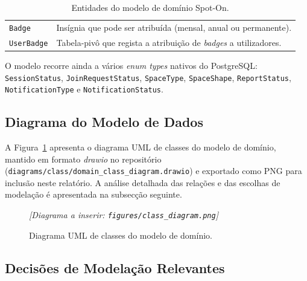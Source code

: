 \documentclass[11pt,a4paper]{article}
\begin{document}
\begin{table}[H]
\begin{tabularx}{\linewidth}{@{}lX@{}}
        \texttt{Badge}              & Insígnia que pode ser atribuída (mensal, anual ou permanente).                                                                                                            \\
        \texttt{UserBadge}          & Tabela-pivô que regista a atribuição de \emph{badges} a utilizadores.                                                                                                     \\
        \bottomrule
    \end{tabularx}
    \caption{Entidades do modelo de domínio Spot-On.}
\end{table}

O modelo recorre ainda a vários \emph{enum types} nativos do PostgreSQL:
\texttt{SessionStatus}, \texttt{JoinRequestStatus}, \texttt{SpaceType},
\texttt{SpaceShape}, \texttt{ReportStatus}, \texttt{NotificationType} e
\texttt{NotificationStatus}.

\subsection{Diagrama do Modelo de Dados}

A Figura~\ref{fig:classdiag} apresenta o diagrama UML de classes do modelo de
domínio, mantido em formato \emph{drawio} no repositório
(\texttt{diagrams/class/domain\_class\_diagram.drawio}) e exportado como PNG
para inclusão neste relatório. A análise detalhada das relações e das
escolhas de modelação é apresentada na subsecção seguinte.

\begin{figure}[H]
    \centering
    \vspace{1em}\textit{[Diagrama a inserir: \texttt{figures/class\_diagram.png}]}\vspace{1em}
    \caption{Diagrama UML de classes do modelo de domínio.}\label{fig:classdiag}
\end{figure}

\subsection{Decisões de Modelação Relevantes}
\end{document}
